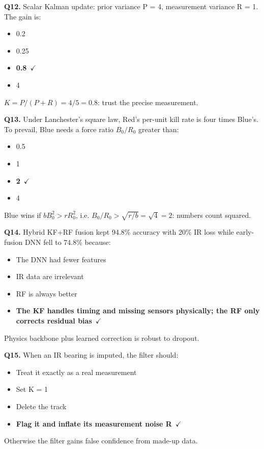\documentclass[11pt]{article}
\begin{document}
{\noindent\textbf{Q12.} Scalar Kalman update: prior variance P = 4, measurement variance R = 1. The gain is:\begin{itemize}[leftmargin=2.2em,itemsep=0pt,topsep=1pt]\item[A.] 0.2\item[B.] 0.25\item[\textbf{C.}] \textbf{0.8}~{\color{GrnN}$\checkmark$}\item[D.] 4\end{itemize} $K=P/(P+R)=4/5=0.8$: trust the precise measurement.\par\medskip

\noindent\textbf{Q13.} Under Lanchester's square law, Red's per-unit kill rate is four times Blue's. To prevail, Blue needs a force ratio $B_0/R_0$ greater than:\begin{itemize}[leftmargin=2.2em,itemsep=0pt,topsep=1pt]\item[A.] 0.5\item[B.] 1\item[\textbf{C.}] \textbf{2}~{\color{GrnN}$\checkmark$}\item[D.] 4\end{itemize} Blue wins if $bB_0^2>rR_0^2$, i.e. $B_0/R_0>\sqrt{r/b}=\sqrt4=2$: numbers count squared.\par\medskip

\noindent\textbf{Q14.} Hybrid KF+RF fusion kept 94.8\% accuracy with 20\% IR loss while early-fusion DNN fell to 74.8\% because:\begin{itemize}[leftmargin=2.2em,itemsep=0pt,topsep=1pt]\item[A.] The DNN had fewer features\item[B.] IR data are irrelevant\item[C.] RF is always better\item[\textbf{D.}] \textbf{The KF handles timing and missing sensors physically; the RF only corrects residual bias}~{\color{GrnN}$\checkmark$}\end{itemize} Physics backbone plus learned correction is robust to dropout.\par\medskip

\noindent\textbf{Q15.} When an IR bearing is imputed, the filter should:\begin{itemize}[leftmargin=2.2em,itemsep=0pt,topsep=1pt]\item[A.] Treat it exactly as a real measurement\item[B.] Set K = 1\item[C.] Delete the track\item[\textbf{D.}] \textbf{Flag it and inflate its measurement noise R}~{\color{GrnN}$\checkmark$}\end{itemize} Otherwise the filter gains false confidence from made-up data.\par\medskip

}
\end{document}

